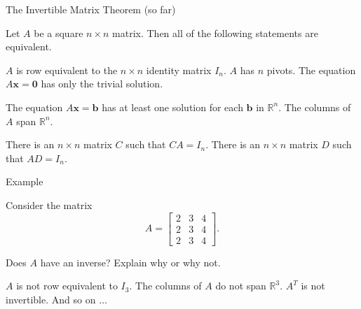 \documentclass[xcolor=dvipsnames,aspectratio=169,t]{beamer}
\begin{document}
\begin{frame}{The Invertible Matrix Theorem (so far)}

Let $A$ be a square $n \times n$ matrix. Then all of the following statements are equivalent.
  
 \bb[(a)]
  \ii {}
  \ii $A$ is row equivalent to the $n \times n$ identity matrix $I_n$.
  \ii $A$ has $n$ pivots.
  \ii The equation $A \mathbf{x} = \mathbf{0}$ has only the trivial solution.
  \addtocounter{enumi}{2}
  \ii The equation $A \mathbf{x} = \mathbf{b}$ has at least one solution for each $\mathbf{b}$ in $\mathbb{R}^n$.
  \ii The columns of $A$ span $\mathbb{R}^n$.
  \addtocounter{enumi}{1}
  \ii There is an $n \times n$ matrix $C$ such that $CA = I_n$.
  \ii There is an $n \times n$ matrix $D$ such that $AD = I_n$.
  \ii {}
\ee

\end{frame}

\begin{frame}{Example}

  Consider the matrix
  \[ A = \begin{bmatrix} 2 & 3 & 4\\ 2& 3 & 4\\2 & 3 & 4\end{bmatrix} .\]

  Does $A$ have an inverse? Explain why or why not.
  \medskip
  
  \pause
  \bi
  \ii $A$ is not row equivalent to $I_3$.
  \ii The columns of $A$ do not span $\mathbb{R}^3$.
  \ii $A^T$ is not invertible.
  \ii And so on $\ldots$
  \ei

\end{frame}
\end{document}
